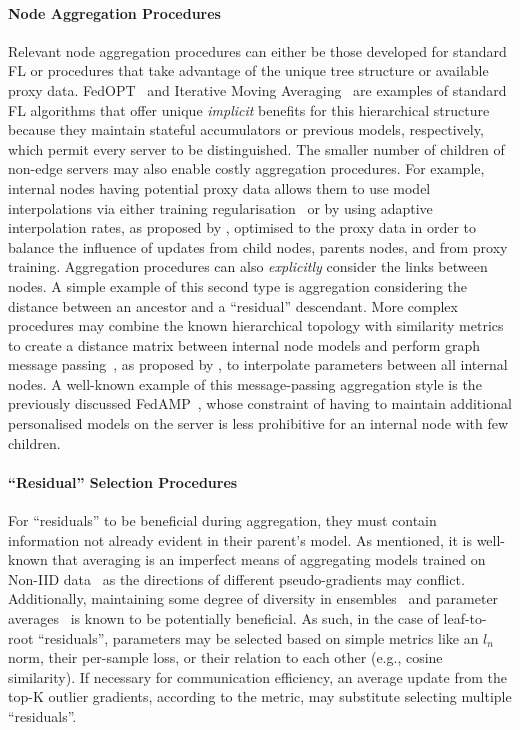 \paragraph{Node Aggregation Procedures} Relevant node aggregation procedures can either be those developed for standard FL or procedures that take advantage of the unique tree structure or available proxy data. FedOPT~\citep{FedOPT} and Iterative Moving Averaging~\citep{UnderstandingModelAveragingInFL} are examples of standard FL algorithms that offer unique \emph{implicit} benefits for this hierarchical structure because they maintain stateful accumulators or previous models, respectively, which permit every server to be distinguished. The smaller number of children of non-edge servers may also enable costly aggregation procedures.  For example, internal nodes having potential proxy data allows them to use model interpolations via either training regularisation~\citep{Ditto} or by using adaptive interpolation rates, as proposed by \citet{AdaptivePersonalisedFederatedLearning}, optimised to the proxy data in order to balance the influence of updates from child nodes, parents nodes, and
from proxy training. Aggregation procedures can also \emph{explicitly} consider the links between nodes. A simple example of this second type is aggregation considering the distance between an ancestor and a ``residual'' descendant. More complex procedures may combine the known hierarchical topology with similarity metrics to create a distance matrix between internal node models and perform graph message passing~\citep{GNNSurvey}, as proposed by \citet{FederatedLearningWithGraph}, to interpolate parameters between all internal nodes. A well-known example of this message-passing aggregation style is the previously discussed FedAMP~\citep{FedAMP}, whose constraint of having to maintain additional personalised models on the server is less prohibitive for an internal node with few children.
\paragraph{``Residual'' Selection Procedures} For ``residuals'' to be beneficial during aggregation, they must contain information not already evident in their parent's model. As mentioned, it is well-known that averaging is an imperfect means of aggregating models trained on Non-IID data~\citep{FedAvg,LargeCohorts,OnTheConvergenceOfFedAvgOnNonIIDdata,FedProx} as the directions of different pseudo-gradients may conflict. Additionally, maintaining some degree of diversity in ensembles~\citep{StochasticMultipleChoiceLearningDiverseEnsembles} and parameter averages~\citep{DiverseWeightAveraging} is known to be potentially beneficial. As such, in the case of leaf-to-root ``residuals'', parameters may be selected based on simple metrics like an $l_n$ norm, their per-sample loss, or their relation to each other (e.g., cosine similarity). If necessary for communication efficiency, an average update from the top-K outlier gradients, according to the metric, may substitute selecting multiple ``residuals''.
